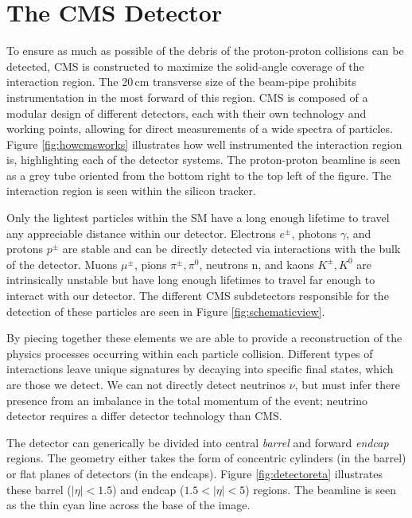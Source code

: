 \chapter{The CMS Detector}
\label{chap:detector}

To ensure as much as possible of the debris of the proton-proton collisions can be detected, CMS is constructed to maximize the solid-angle coverage of the interaction region. The 20$\,$cm transverse size of the beam-pipe prohibits instrumentation in the most forward of this region. CMS is composed of a modular design of different detectors, each with their own technology and working points, allowing for direct measurements of a wide spectra of particles. Figure \ref{fig:howcmsworks} illustrates how well instrumented the interaction region is, highlighting each of the detector systems. The proton-proton beamline is seen as a grey tube oriented from the bottom right to the top left of the figure. The interaction region is seen within the silicon tracker.

Only the lightest particles within the SM have a long enough lifetime to travel any appreciable distance within our detector. Electrons $e^{\pm}$, photons $\gamma$, and protons $p^{\pm}$ are stable and can be directly detected via interactions with the bulk of the detector. Muons $\mu^{\pm}$, pions $\pi^{\pm}, \pi^{0}$, neutrons n, and kaons $K^{\pm}, K^{0}$ are intrinsically unstable but have long enough lifetimes to travel far enough to interact with our detector. The different CMS subdetectors responsible for the detection of these particles are seen in Figure \ref{fig:schematicview}.

By piecing together these elements we are able to provide a reconstruction of the physics processes occurring within each particle collision. Different types of interactions leave unique signatures by decaying into specific final states, which are those we detect. We can not directly detect neutrinos $\nu$, but must infer there presence from an imbalance in the total momentum of the event; neutrino detector requires a differ detector technology than CMS.

The detector can generically be divided into central \textit{barrel} and forward \textit{endcap} regions. The geometry either takes the form of concentric cylinders (in the barrel) or flat planes of detectors (in the endcaps). Figure \ref{fig:detectoreta} illustrates these barrel ($|\eta|<1.5$) and endcap ($1.5<|\eta|<5$) regions. The beamline is seen as the thin cyan line across the base of the image.  

